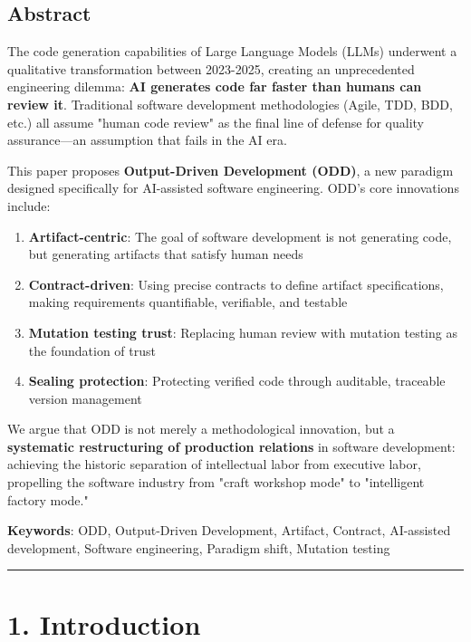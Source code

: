 \documentclass[
]{article}
\begin{document}
\hypertarget{abstract}{%
\subsection{Abstract}\label{abstract}}

The code generation capabilities of Large Language Models (LLMs)
underwent a qualitative transformation between 2023-2025, creating an
unprecedented engineering dilemma: \textbf{AI generates code far faster
than humans can review it}. Traditional software development
methodologies (Agile, TDD, BDD, etc.) all assume "human code review" as
the final line of defense for quality assurance---an assumption that
fails in the AI era.

This paper proposes \textbf{Output-Driven Development (ODD)}, a new
paradigm designed specifically for AI-assisted software engineering.
ODD's core innovations include:

\begin{enumerate}
\def\labelenumi{\arabic{enumi}.}
\item
  \textbf{Artifact-centric}: The goal of software development is not
  generating code, but generating artifacts that satisfy human needs
\item
  \textbf{Contract-driven}: Using precise contracts to define artifact
  specifications, making requirements quantifiable, verifiable, and
  testable
\item
  \textbf{Mutation testing trust}: Replacing human review with mutation
  testing as the foundation of trust
\item
  \textbf{Sealing protection}: Protecting verified code through
  auditable, traceable version management
\end{enumerate}

We argue that ODD is not merely a methodological innovation, but a
\textbf{systematic restructuring of production relations} in software
development: achieving the historic separation of intellectual labor
from executive labor, propelling the software industry from "craft
workshop mode" to "intelligent factory mode."

\textbf{Keywords}: ODD, Output-Driven Development, Artifact, Contract,
AI-assisted development, Software engineering, Paradigm shift, Mutation
testing

\begin{center}\rule{0.5\linewidth}{0.5pt}\end{center}

\hypertarget{1-introduction}{%
\section{1. Introduction}\label{1-introduction}}
\end{document}
